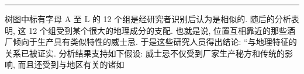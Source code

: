 
\begin{mvfigure}
\label{fig:12.11}
\end{mvfigure}

\vspace{0.4em}
\noindent\rule{\linewidth}{0.4pt}

{
\noindent * 树图中标有字母 A 至 L 的 12 个组是经研究者识别后认为是相似的. 随后的分析表明, 这 12 个组受到某个很大的地理成分的支配.
也就是说, 位置互相靠近的那些酒厂倾向于生产具有类似特性的威士忌. 于是这些研究人员得出结论: “与地理特征的关系已被证实.
分析结果支持如下假设: 威士忌不仅受到厂家生产秘方和传统的影响, 而且还受到与地区有关的诸如\par}

